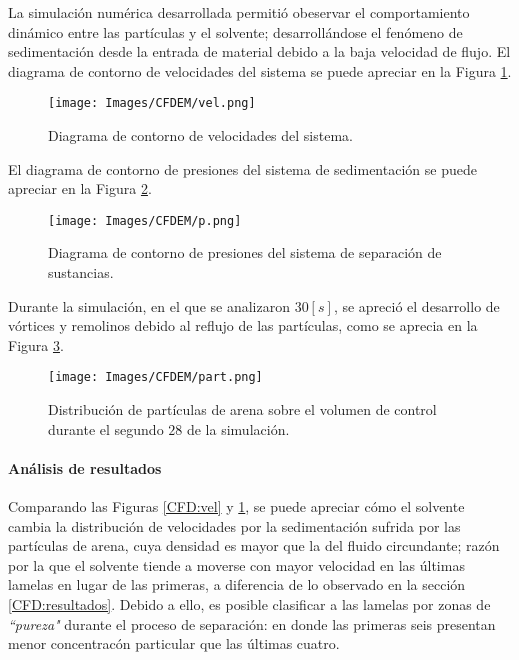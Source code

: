 \vspace{-0.8cm}

\noindent
\justify

La simulaci\'on num\'erica desarrollada permiti\'o obeservar el comportamiento din\'amico entre las part\'iculas y el solvente; desarroll\'andose el fen\'omeno de sedimentaci\'on desde la entrada de material debido a la baja velocidad de flujo. El diagrama de contorno de velocidades del sistema se puede apreciar en la Figura \ref{CFDEM:vel}.

\begin{figure}[h!]
	\centering
	\texttt{[image: Images/CFDEM/vel.png]}
	\caption{Diagrama de contorno de velocidades del sistema.}
	\label{CFDEM:vel}
\end{figure}

\newpage

\noindent
\justify

El diagrama de contorno de presiones del sistema de sedimentaci\'on se puede apreciar en la Figura \ref{CFDEM:p}.

\begin{figure}[h!]
	\centering
	\texttt{[image: Images/CFDEM/p.png]}
	\caption{Diagrama de contorno de presiones del sistema de separaci\'on de sustancias.}
	\label{CFDEM:p}
\end{figure}

\noindent
\justify

Durante la simulaci\'on, en el que se analizaron $30 [s]$, se apreci\'o el desarrollo de v\'ortices y remolinos debido al reflujo de las part\'iculas, como se aprecia en la Figura \ref{CFDEM:part}.

\begin{figure}[h!]
	\centering
	\texttt{[image: Images/CFDEM/part.png]}
	\caption{Distribuci\'on de part\'iculas de arena sobre el volumen de control durante el segundo $28$ de la simulaci\'on.}
	\label{CFDEM:part}
\end{figure}

\newpage

\paragraph{An\'alisis de resultados} \label{CFDEM:analisis}

\noindent
\justify

Comparando las Figuras \ref{CFD:vel} y \ref{CFDEM:vel}, se puede apreciar c\'omo el solvente cambia la distribuci\'on de velocidades por la sedimentaci\'on sufrida por las part\'iculas de arena, cuya densidad es mayor que la del fluido circundante; raz\'on por la que el solvente tiende a moverse con mayor velocidad en las \'ultimas lamelas en lugar de las primeras, a diferencia de lo observado en la secci\'on \ref{CFD:resultados}. Debido a ello, es posible clasificar a las lamelas por zonas de \textit{``pureza"} durante el proceso de separaci\'on: en donde las primeras seis presentan menor concentrac\'on particular que las \'ultimas cuatro.

